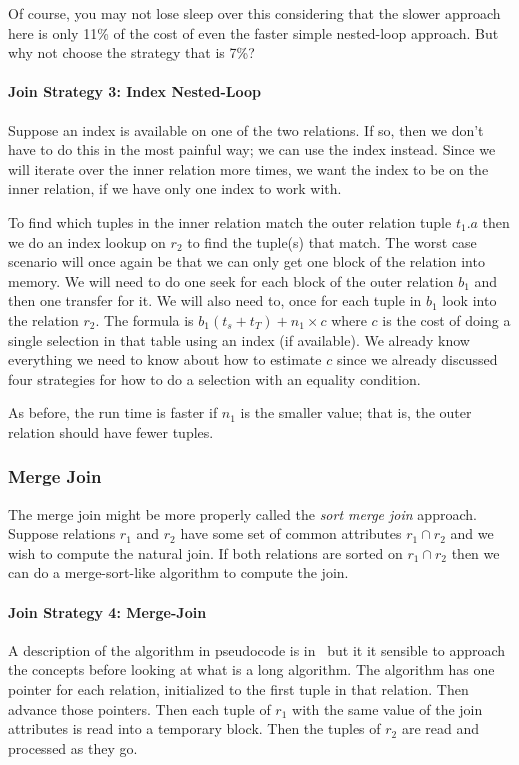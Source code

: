 \documentclass[a4paper]{report}
\begin{document}
Of course, you may not lose sleep over this considering that the slower approach here is only 11\% of the cost of even the faster simple nested-loop approach. But why not choose the strategy that is 7\%? 

\paragraph{Join Strategy 3: Index Nested-Loop}
Suppose an index is available on one of the two relations. If so, then we don't have to do this in the most painful way; we can use the index instead. Since we will iterate over the inner relation more times, we want the index to be on the inner relation, if we have only one index to work with.

To find which tuples in the inner relation match the outer relation tuple $t_{1}.a$ then we do an index lookup on $r_{2}$ to find the tuple(s) that match. The worst case scenario will once again be that we can only get one block of the relation into memory. We will need to do one seek for each block of the outer relation $b_{1}$ and then one transfer for it. We will also need to, once for each tuple in $b_{1}$ look into the relation $r_{2}$. The formula is $b_{1} ( t_{s} + t_{T} ) + n_{1} \times c$  where $c$ is the cost of doing a single selection in that table using an index (if available). We already know everything we need to know about how to estimate $c$ since we already discussed four strategies for how to do a selection with an equality condition.

As before, the run time is faster if $n_{1}$ is the smaller value; that is, the outer relation should have fewer tuples. 

\subsubsection*{Merge Join}
The merge join might be more properly called the \textit{sort merge join} approach. Suppose relations $r_{1}$ and $r_{2}$ have some set of common attributes $r_{1} \cap r_{2}$ and we wish to compute the natural join. If both relations are sorted on  $r_{1} \cap r_{2}$ then we can do a merge-sort-like algorithm to compute the join.

\paragraph{Join Strategy 4: Merge-Join}
A description of the algorithm in pseudocode is in~\cite{dsc} but it it sensible to approach the concepts before looking at what is a long algorithm. The algorithm has one pointer for each relation, initialized to the first tuple in that relation. Then advance those pointers. Then each tuple of $r_{1}$ with the same value of the join attributes is read into a temporary block. Then the tuples of $r_{2}$ are read and processed as they go.
\end{document}

